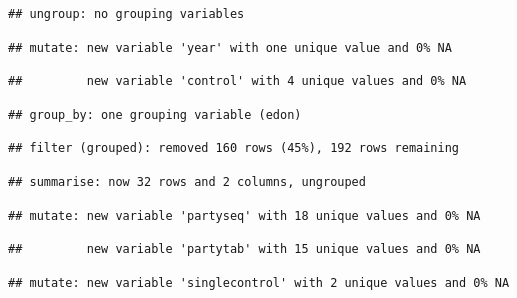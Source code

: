 \documentclass[
]{article}
\newenvironment{Shaded}{\begin{snugshade}}{\end{snugshade}}
\newcommand{\DataTypeTok}[1]{\textcolor[rgb]{0.13,0.29,0.53}{#1}}
\newcommand{\DecValTok}[1]{\textcolor[rgb]{0.00,0.00,0.81}{#1}}
\newcommand{\KeywordTok}[1]{\textcolor[rgb]{0.13,0.29,0.53}{\textbf{#1}}}
\newcommand{\NormalTok}[1]{#1}
\newcommand{\OperatorTok}[1]{\textcolor[rgb]{0.81,0.36,0.00}{\textbf{#1}}}
\newcommand{\StringTok}[1]{\textcolor[rgb]{0.31,0.60,0.02}{#1}}
\begin{document}
\begin{verbatim}
## ungroup: no grouping variables
\end{verbatim}

\begin{verbatim}
## mutate: new variable 'year' with one unique value and 0% NA
\end{verbatim}

\begin{verbatim}
##         new variable 'control' with 4 unique values and 0% NA
\end{verbatim}

\begin{Shaded}
\end{Shaded}

\begin{verbatim}
## group_by: one grouping variable (edon)
\end{verbatim}

\begin{verbatim}
## filter (grouped): removed 160 rows (45%), 192 rows remaining
\end{verbatim}

\begin{verbatim}
## summarise: now 32 rows and 2 columns, ungrouped
\end{verbatim}

\begin{verbatim}
## mutate: new variable 'partyseq' with 18 unique values and 0% NA
\end{verbatim}

\begin{verbatim}
##         new variable 'partytab' with 15 unique values and 0% NA
\end{verbatim}

\begin{verbatim}
## mutate: new variable 'singlecontrol' with 2 unique values and 0% NA
\end{verbatim}
\end{document}
